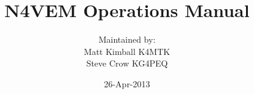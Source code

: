 \documentclass[pdflatex,letterpaper,twoside,12pt]{book}
\title             {N4VEM Operations Manual}
\author            {Maintained by:\\Matt Kimball K4MTK\\Steve Crow KG4PEQ}
\date              {26-Apr-2013}
\begin{document}
\arcaTitlePage
\skipToTOC
\arcaTOC





\end{document}
